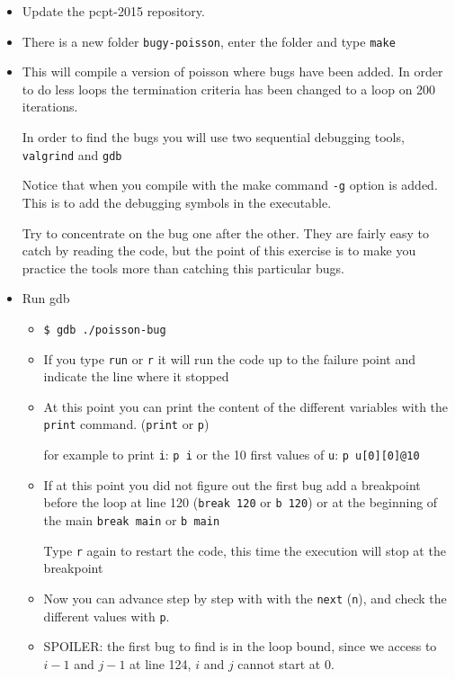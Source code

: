 \documentclass[11pt,a4paper]{article}
\begin{document}
\begin{exercise}[Debugging]
  $~$ %
  \begin{itemize}
  \item Update the pcpt-2015 repository.
  \item There is a new folder \texttt{bugy-poisson}, enter the folder and type
    \texttt{make}
  \item This will compile a version of poisson where bugs have been added.
    In order to do less loops the termination criteria has been changed to a
    loop on 200 iterations.

    In order to find the bugs you will use two sequential debugging tools,
    \texttt{valgrind} and \texttt{gdb}

    Notice that when you compile with the make command \texttt{-g} option is
    added. This is to add the debugging symbols in the executable.

    Try  to concentrate on the bug one after the other. They are fairly easy to
    catch by reading the code, but the point of this exercise is to make you
    practice the tools more than catching this particular bugs.
  \item Run gdb
    \begin{itemize}
    \item \texttt{\$ gdb ./poisson-bug}
    \item If you type \texttt{run} or \texttt{r} it will run the code up to the
      failure point and indicate the line where it stopped
    \item At this point you can print the content of the different variables
      with the \texttt{print} command. (\texttt{print} or \texttt{p})

      for example to print \texttt{i}: \texttt{p i}
      or the 10 first values of \texttt{u}: \texttt{p u[0][0]@10}
    \item If at this point you did not figure out the first bug add a breakpoint
      before the loop at line 120 (\texttt{break 120} or \texttt{b 120}) or at
      the beginning of the main \texttt{break main} or \texttt{b main}

      Type \texttt{r} again to restart the code, this time the execution will
      stop at the breakpoint
    \item Now you can advance step by step with with the \texttt{next}
      (\texttt{n}), and check the different values with \texttt{p}.

    \item SPOILER: the first bug to find is in the loop bound, since we access
      to $i-1$ and $j-1$ at line 124, $i$ and $j$ cannot start at 0.


\end{itemize}
\end{itemize}
\end{exercise}
\end{document}
